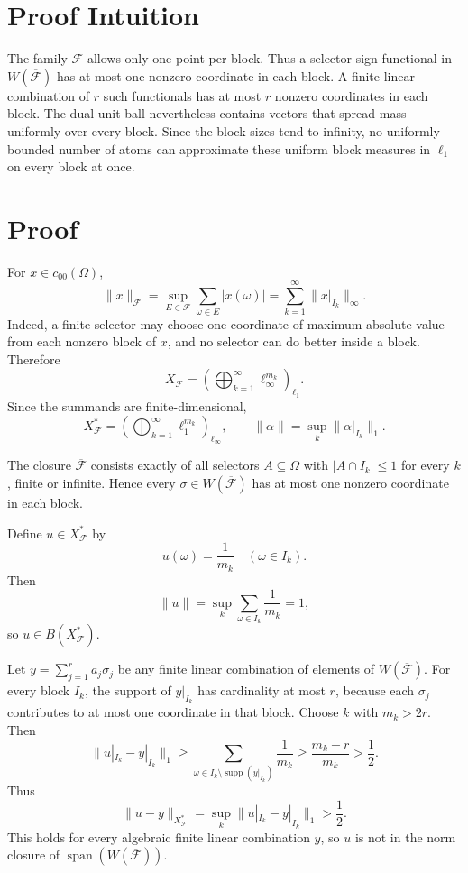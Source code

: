 \documentclass[11pt]{article}
\begin{document}
\section*{Proof Intuition}

The family $\mathcal F$ allows only one point per block.  Thus a selector-sign
functional in $W(\overline{\mathcal F})$ has at most one nonzero coordinate in
each block.  A finite linear combination of $r$ such functionals has at most
$r$ nonzero coordinates in each block.  The dual unit ball nevertheless
contains vectors that spread mass uniformly over every block.  Since the block
sizes tend to infinity, no uniformly bounded number of atoms can approximate
these uniform block measures in $\ell_1$ on every block at once.

\section*{Proof}

For $x\in c_{00}(\Omega)$,
\[
  \|x\|_{\mathcal F}
  =\sup_{E\in\mathcal F}\sum_{\omega\in E}|x(\omega)|
  =\sum_{k=1}^\infty \|x|_{I_k}\|_\infty.
\]
Indeed, a finite selector may choose one coordinate of maximum absolute value
from each nonzero block of $x$, and no selector can do better inside a block.
Therefore
\[
  X_{\mathcal F}
  =
  \left(\bigoplus_{k=1}^\infty \ell_\infty^{m_k}\right)_{\ell_1}.
\]
Since the summands are finite-dimensional,
\[
  X_{\mathcal F}^*
  =
  \left(\bigoplus_{k=1}^\infty \ell_1^{m_k}\right)_{\ell_\infty},
  \qquad
  \|\alpha\|=\sup_k \|\alpha|_{I_k}\|_1.
\]

The closure $\overline{\mathcal F}$ consists exactly of all selectors
$A\subseteq\Omega$ with $|A\cap I_k|\leq1$ for every $k$, finite or infinite.
Hence every $\sigma\in W(\overline{\mathcal F})$ has at most one nonzero
coordinate in each block.

Define $u\in X_{\mathcal F}^*$ by
\[
  u(\omega)=\frac{1}{m_k}\quad(\omega\in I_k).
\]
Then
\[
  \|u\|=\sup_k \sum_{\omega\in I_k}\frac1{m_k}=1,
\]
so $u\in B(X_{\mathcal F}^*)$.

Let $y=\sum_{j=1}^r a_j\sigma_j$ be any finite linear combination of elements
of $W(\overline{\mathcal F})$.  For every block $I_k$, the support of
$y|_{I_k}$ has cardinality at most $r$, because each $\sigma_j$ contributes to
at most one coordinate in that block.  Choose $k$ with $m_k>2r$.  Then
\[
  \|u|_{I_k}-y|_{I_k}\|_1
  \geq
  \sum_{\omega\in I_k\setminus \operatorname{supp}(y|_{I_k})}
  \frac1{m_k}
  \geq \frac{m_k-r}{m_k}
  >\frac12.
\]
Thus
\[
  \|u-y\|_{X_{\mathcal F}^*}
  =\sup_k\|u|_{I_k}-y|_{I_k}\|_1
  >\frac12.
\]
This holds for every algebraic finite linear combination $y$, so $u$ is not in
the norm closure of $\operatorname{span}(W(\overline{\mathcal F}))$.
\end{document}
